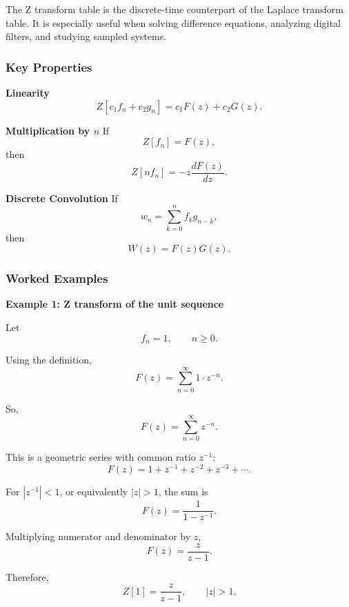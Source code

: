 \begin{noteBox}
    The Z transform table is the discrete-time counterpart of the Laplace transform table. It is especially useful when solving difference equations, analyzing digital filters, and studying sampled systems.
\end{noteBox}

\subsubsection*{Key Properties}

\begin{conceptbox}
    \textbf{Linearity}
    \[
        Z[c_1f_n+c_2g_n]
        =
        c_1F(z)+c_2G(z).
    \]
\end{conceptbox}

\begin{conceptbox}
    \textbf{Multiplication by $n$}
    If
    \[
        Z[f_n]=F(z),
    \]
    then
    \[
        Z[nf_n]
        =
        -z\frac{dF(z)}{dz}.
    \]
\end{conceptbox}

\begin{conceptbox}
    \textbf{Discrete Convolution}
    If
    \[
        w_n=\sum_{k=0}^{n}f_kg_{n-k},
    \]
    then
    \[
        W(z)=F(z)G(z).
    \]
\end{conceptbox}

\subsubsection*{Worked Examples}

\begin{examplebox}
    \textbf{Example 1: Z transform of the unit sequence}

    Let
    \[
        f_n=1, \qquad n\geq 0.
    \]

    Using the definition,
    \[
        F(z)=\sum_{n=0}^{\infty}1\cdot z^{-n}.
    \]

    So,
    \[
        F(z)=\sum_{n=0}^{\infty}z^{-n}.
    \]

    This is a geometric series with common ratio $z^{-1}$:
    \[
        F(z)=1+z^{-1}+z^{-2}+z^{-3}+\cdots.
    \]

    For $|z^{-1}|<1$, or equivalently $|z|>1$, the sum is
    \[
        F(z)=\frac{1}{1-z^{-1}}.
    \]

    Multiplying numerator and denominator by $z$,
    \[
        F(z)=\frac{z}{z-1}.
    \]

    Therefore,
    \[
        \boxed{
            Z[1]=\frac{z}{z-1}, \qquad |z|>1.
        }
    \]
\end{examplebox}

